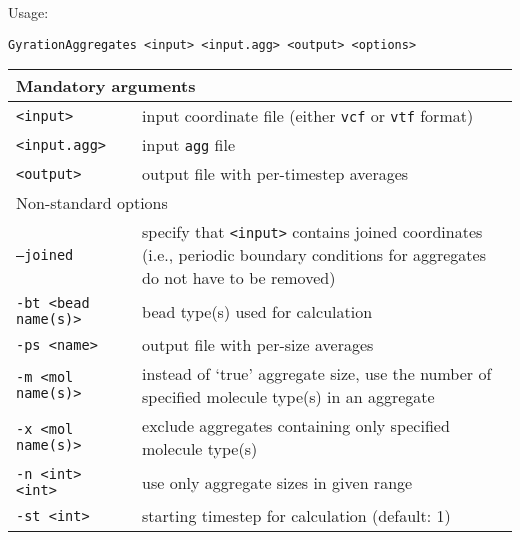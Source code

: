 Usage:

\vspace{1em}
\noindent
\texttt{GyrationAggregates <input> <input.agg> <output> <options>}

\noindent
\begin{longtable}{p{}p{}}
  \toprule
  \multicolumn{2}{l}{Mandatory arguments} \\
  \midrule
  \texttt{<input>} & input coordinate file (either \texttt{vcf} or
    \texttt{vtf} format) \\
  \texttt{<input.agg>} & input \texttt{agg} file \\
  \texttt{<output>} & output file with per-timestep averages \\
  \toprule
  \multicolumn{2}{l}{Non-standard options} \\
  \midrule
  \texttt{--joined} & specify that \texttt{<input>} contains joined
    coordinates (i.e., periodic boundary conditions for aggregates do not
    have to be removed) \\
  \texttt{-bt <bead name(s)>} & bead type(s) used for calculation \\
  \texttt{-ps <name>} & output file with per-size averages \\
  \texttt{-m <mol name(s)>} & instead of `true' aggregate size, use the number
    of specified molecule type(s) in an aggregate \\
  \texttt{-x <mol name(s)>} & exclude aggregates containing only specified
    molecule type(s) \\
  \texttt{-n <int> <int>} & use only aggregate sizes in given range \\
  \texttt{-st <int>} & starting timestep for calculation (default: 1) \\
  \bottomrule
\end{longtable}

